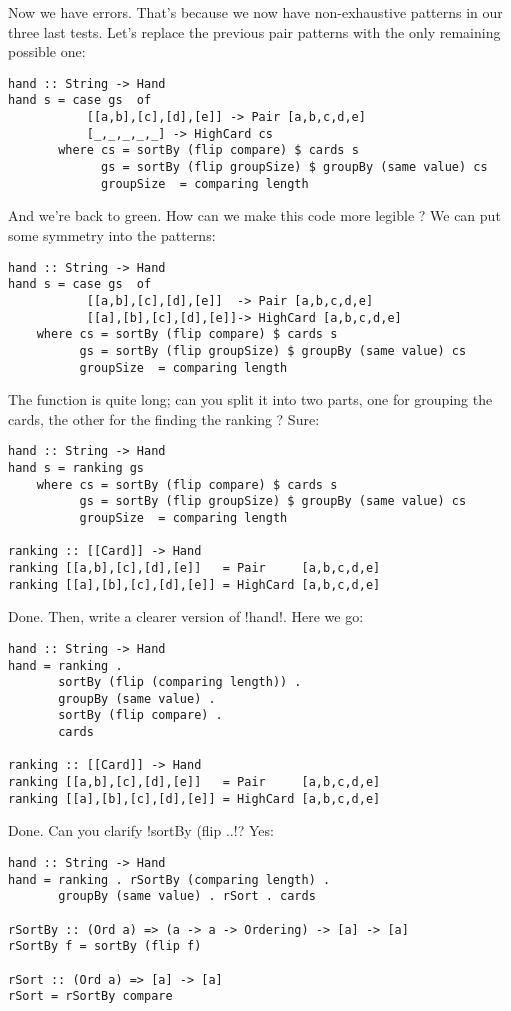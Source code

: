 \failure Now we have errors.
\lhN That's because we now have non-exhaustive patterns in our three last tests.
\lhA \failure Let's replace the previous pair patterns with the only remaining possible one:
\begin{lstlisting}[frame=single]
hand :: String -> Hand
hand s = case gs  of
           [[a,b],[c],[d],[e]] -> Pair [a,b,c,d,e]
           [_,_,_,_,_] -> HighCard cs 
       where cs = sortBy (flip compare) $ cards s
             gs = sortBy (flip groupSize) $ groupBy (same value) cs
             groupSize  = comparing length 
\end{lstlisting}
\success And we're back to green.
\lhN How can we make this code more legible ?
\lhA We can put some symmetry into the patterns:
\begin{lstlisting}[frame=single]
hand :: String -> Hand
hand s = case gs  of
           [[a,b],[c],[d],[e]]  -> Pair [a,b,c,d,e]
           [[a],[b],[c],[d],[e]]-> HighCard [a,b,c,d,e] 
    where cs = sortBy (flip compare) $ cards s
          gs = sortBy (flip groupSize) $ groupBy (same value) cs
          groupSize  = comparing length 
\end{lstlisting}
\lhN The function is quite long; can you split it into two parts, one for grouping the cards, the other for the finding the ranking ?
\lhA \success Sure:
\begin{lstlisting}[frame=single]
hand :: String -> Hand
hand s = ranking gs
    where cs = sortBy (flip compare) $ cards s
          gs = sortBy (flip groupSize) $ groupBy (same value) cs
          groupSize  = comparing length 

ranking :: [[Card]] -> Hand
ranking [[a,b],[c],[d],[e]]   = Pair     [a,b,c,d,e]
ranking [[a],[b],[c],[d],[e]] = HighCard [a,b,c,d,e] 
\end{lstlisting}
\success Done.
\lhN Then, write a clearer version of \il!hand!.
\lhA Here we go:
\begin{lstlisting}[frame=single]
hand :: String -> Hand
hand = ranking .
       sortBy (flip (comparing length)) .
       groupBy (same value) .
       sortBy (flip compare) .
       cards

ranking :: [[Card]] -> Hand
ranking [[a,b],[c],[d],[e]]   = Pair     [a,b,c,d,e]
ranking [[a],[b],[c],[d],[e]] = HighCard [a,b,c,d,e] 
\end{lstlisting}
\success Done.
\lhN Can you clarify \il!sortBy (flip ..!?
\lhA Yes:
\begin{lstlisting}[frame=single]
hand :: String -> Hand
hand = ranking . rSortBy (comparing length) .
       groupBy (same value) . rSort . cards

rSortBy :: (Ord a) => (a -> a -> Ordering) -> [a] -> [a]
rSortBy f = sortBy (flip f)

rSort :: (Ord a) => [a] -> [a]
rSort = rSortBy compare
\end{lstlisting}
\lhend


